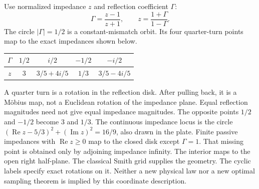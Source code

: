 Use normalized impedance $z$ and reflection coefficient $\Gamma$:
\[
\Gamma=\frac{z-1}{z+1},\qquad z=\frac{1+\Gamma}{1-\Gamma}.
\]
The circle $|\Gamma|=1/2$ is a constant-mismatch orbit. Its four quarter-turn points map to the exact impedances shown below.
\begin{center}
\begin{tabular}{c|cccc}
$\Gamma$ & $1/2$ & $i/2$ & $-1/2$ & $-i/2$\\\hline
$z$ & $3$ & $3/5+4i/5$ & $1/3$ & $3/5-4i/5$
\end{tabular}
\end{center}
A quarter turn is a rotation in the reflection disk. After pulling back, it is a M\"obius map, not a Euclidean rotation of the impedance plane. Equal reflection magnitudes need not give equal impedance magnitudes. The opposite points $1/2$ and $-1/2$ become $3$ and $1/3$. The continuous impedance locus is the circle $(\operatorname{Re}z-5/3)^2+(\operatorname{Im}z)^2=16/9$, also drawn in the plate.
Finite passive impedances with $\operatorname{Re}z\ge0$ map to the closed disk except $\Gamma=1$. That missing point is obtained only by adjoining impedance infinity. The interior maps to the open right half-plane.
The classical Smith grid supplies the geometry. The cyclic labels specify exact rotations on it. Neither a new physical law nor a new optimal sampling theorem is implied by this coordinate description.

